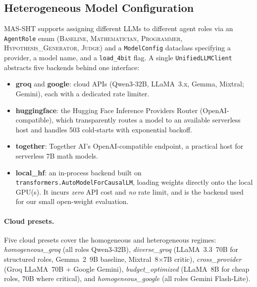 \documentclass[11pt,a4paper]{article}
\begin{document}
\subsection{Heterogeneous Model Configuration}
\label{sec:heterogeneous}
MAS-SHT supports assigning different LLMs to different agent roles via an \texttt{AgentRole} enum (\textsc{Baseline}, \textsc{Mathematician}, \textsc{Programmer}, \textsc{Hypothesis\_Generator}, \textsc{Judge}) and a \texttt{ModelConfig} dataclass specifying a provider, a model name, and a \texttt{load\_4bit} flag.
A single \texttt{UnifiedLLMClient} abstracts five backends behind one interface:
\begin{itemize}[leftmargin=*,itemsep=1pt]
    \item \textbf{groq} and \textbf{google}: cloud APIs (Qwen3-32B, LLaMA~3.x, Gemma, Mixtral; Gemini), each with a dedicated rate limiter.
    \item \textbf{huggingface}: the Hugging Face Inference Providers Router (OpenAI-compatible), which transparently routes a model to an available serverless host and handles 503 cold-starts with exponential backoff.
    \item \textbf{together}: Together AI's OpenAI-compatible endpoint, a practical host for serverless 7B math models.
    \item \textbf{local\_hf}: an in-process backend built on \texttt{transformers.AutoModelForCausalLM}, loading weights directly onto the local GPU(s). It incurs \emph{zero} API cost and \emph{no} rate limit, and is the backend used for our small open-weight evaluation.
\end{itemize}
\paragraph{Cloud presets.}
Five cloud presets cover the homogeneous and heterogeneous regimes: \textit{homogeneous\_groq} (all roles Qwen3-32B), \textit{diverse\_groq} (LLaMA~3.3~70B for structured roles, Gemma~2~9B baseline, Mixtral~8$\times$7B critic), \textit{cross\_provider} (Groq LLaMA~70B $+$ Google Gemini), \textit{budget\_optimized} (LLaMA~8B for cheap roles, 70B where critical), and \textit{homogeneous\_google} (all roles Gemini Flash-Lite).
\end{document}
